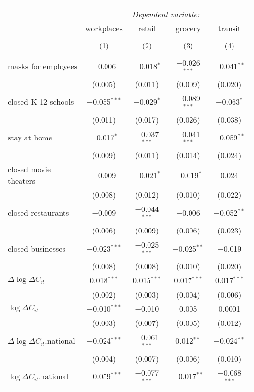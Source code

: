 \begin{tabular}{@{\extracolsep{1pt}}lcccc} 
\\[-1.8ex]\hline 
\hline \\[-1.8ex] 
 & \multicolumn{4}{c}{\textit{Dependent variable:}} \\ 
\cline{2-5} 
 & workplaces & retail & grocery & transit \\ 
\\[-1.8ex] & (1) & (2) & (3) & (4)\\ 
\hline \\[-1.8ex] 
 masks for employees & $-$0.006 & $-$0.018$^{*}$ & $-$0.026$^{***}$ & $-$0.041$^{**}$ \\ 
  & (0.005) & (0.011) & (0.009) & (0.020) \\ 
  closed K-12 schools & $-$0.055$^{***}$ & $-$0.029$^{*}$ & $-$0.089$^{***}$ & $-$0.063$^{*}$ \\ 
  & (0.011) & (0.017) & (0.026) & (0.038) \\ 
  stay at home & $-$0.017$^{*}$ & $-$0.037$^{***}$ & $-$0.041$^{***}$ & $-$0.059$^{**}$ \\ 
  & (0.009) & (0.011) & (0.014) & (0.024) \\ 
  closed movie theaters & $-$0.009 & $-$0.021$^{*}$ & $-$0.019$^{*}$ & 0.024 \\ 
  & (0.008) & (0.012) & (0.010) & (0.022) \\ 
  closed restaurants & $-$0.009 & $-$0.044$^{***}$ & $-$0.006 & $-$0.052$^{**}$ \\ 
  & (0.006) & (0.009) & (0.006) & (0.023) \\ 
  closed businesses & $-$0.023$^{***}$ & $-$0.025$^{***}$ & $-$0.025$^{**}$ & $-$0.019 \\ 
  & (0.008) & (0.008) & (0.010) & (0.020) \\ 
  $\Delta \log \Delta C_{it}$ & 0.018$^{***}$ & 0.015$^{***}$ & 0.017$^{***}$ & 0.017$^{***}$ \\ 
  & (0.002) & (0.003) & (0.004) & (0.006) \\ 
  $\log \Delta C_{it}$ & $-$0.010$^{***}$ & $-$0.010 & 0.005 & 0.0001 \\ 
  & (0.003) & (0.007) & (0.005) & (0.012) \\ 
  $\Delta \log \Delta C_{it}$.national & $-$0.024$^{***}$ & $-$0.061$^{***}$ & 0.012$^{**}$ & $-$0.024$^{**}$ \\ 
  & (0.004) & (0.007) & (0.006) & (0.010) \\ 
  $\log \Delta C_{it}$.national & $-$0.059$^{***}$ & $-$0.077$^{***}$ & $-$0.017$^{**}$ & $-$0.068$^{***}$ \\ 

\end{tabular}
